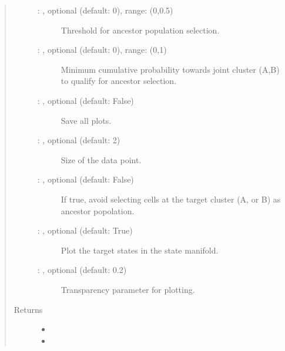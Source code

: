 \documentclass[letterpaper,10pt,english]{sphinxmanual}
\begin{document}
\begin{fulllineitems}
\begin{quote}
\begin{description}
\begin{description}
\item[{ : , optional (default: 0), range: (0,0.5)}] \leavevmode
Threshold for ancestor population selection.

\item[{ : , optional (default: 0), range: (0,1)}] \leavevmode
Minimum cumulative probability towards joint cluster (A,B)
to qualify for ancestor selection.

\item[{ : , optional (default: False)}] \leavevmode
Save all plots.

\item[{ : , optional (default: 2)}] \leavevmode
Size of the data point.

\item[{ : , optional (default: False)}] \leavevmode
If true, avoid selecting cells at the target cluster (A, or B) as
ancestor popolation.

\item[{ : , optional (default: True)}] \leavevmode
Plot the target states in the state manifold.

\item[{ : , optional (default: 0.2)}] \leavevmode
Transparency parameter for plotting.

\end{description}

\item[{Returns}] \leavevmode
\begin{itemize}
\item {} 

\item {} 

\end{itemize}


\end{description}\end{quote}

\end{fulllineitems}
\end{document}
